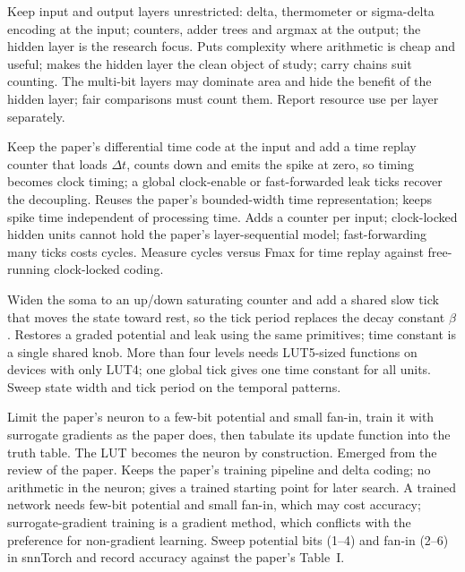 {Keep input and output layers unrestricted: delta, thermometer or sigma-delta encoding at the input; counters, adder trees and argmax at the output; the hidden layer is the research focus.}
{Puts complexity where arithmetic is cheap and useful; makes the hidden layer the clean object of study; carry chains suit counting.}
{The multi-bit layers may dominate area and hide the benefit of the hidden layer; fair comparisons must count them.}
{Report resource use per layer separately.}

{Keep the paper's differential time code at the input and add a time replay counter that loads $\Delta t$, counts down and emits the spike at zero, so timing becomes clock timing; a global clock-enable or fast-forwarded leak ticks recover the decoupling.}
{Reuses the paper's bounded-width time representation; keeps spike time independent of processing time.}
{Adds a counter per input; clock-locked hidden units cannot hold the paper's layer-sequential model; fast-forwarding many ticks costs cycles.}
{Measure cycles versus Fmax for time replay against free-running clock-locked coding.}

{Widen the soma to an up/down saturating counter and add a shared slow tick that moves the state toward rest, so the tick period replaces the decay constant $\beta$.}
{Restores a graded potential and leak using the same primitives; time constant is a single shared knob.}
{More than four levels needs LUT5-sized functions on devices with only LUT4; one global tick gives one time constant for all units.}
{Sweep state width and tick period on the temporal patterns.}

{Limit the paper's neuron to a few-bit potential and small fan-in, train it with surrogate gradients as the paper does, then tabulate its update function into the truth table. The LUT becomes the neuron by construction. Emerged from the review of the paper.}
{Keeps the paper's training pipeline and delta coding; no arithmetic in the neuron; gives a trained starting point for later search.}
{A trained network needs few-bit potential and small fan-in, which may cost accuracy; surrogate-gradient training is a gradient method, which conflicts with the preference for non-gradient learning.}
{Sweep potential bits (1--4) and fan-in (2--6) in snnTorch and record accuracy against the paper's Table~I.}

